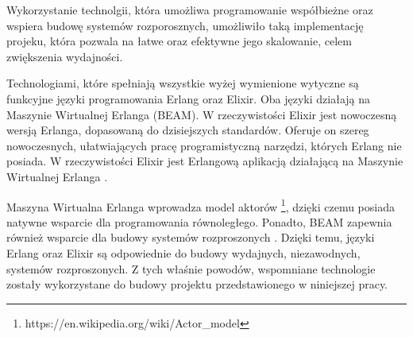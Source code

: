 Wykorzystanie technolgii, która umożliwa programowanie współbieżne oraz wspiera
budowę systemów rozporosznych, umożliwiło taką implementację projeku, która
pozwala na łatwe oraz efektywne jego skalowanie, celem zwiększenia wydajności.

Technologiami, które spełniają wszystkie wyżej wymienione wytyczne są funkcyjne
języki programowania Erlang oraz Elixir. Oba języki działają na Maszynie
Wirtualnej Erlanga (BEAM). W rzeczywistości Elixir jest nowoczesną wersją
Erlanga, dopasowaną do dzisiejszych standardów. Oferuje on szereg nowoczesnych,
ułatwiających pracę programistyczną narzędzi, których Erlang nie posiada. W
rzeczywistości Elixir jest Erlangową aplikacją działającą na Maszynie Wirtualnej
Erlanga \cite{thebeambook}.

Maszyna Wirtualna Erlanga wprowadza model aktorów
\footnote{https://en.wikipedia.org/wiki/Actor\_model}, dzięki czemu posiada
natywne wsparcie dla programowania równoległego. Ponadto, BEAM zapewnia
również wsparcie dla budowy systemów rozproszonych \cite{lyserlang}. Dzięki
temu, języki Erlang oraz Elixir są odpowiednie do budowy wydajnych,
niezawodnych, systemów rozproszonych. Z tych właśnie powodów, wspomniane
technologie zostały wykorzystane do budowy projektu przedstawionego w niniejszej
pracy.